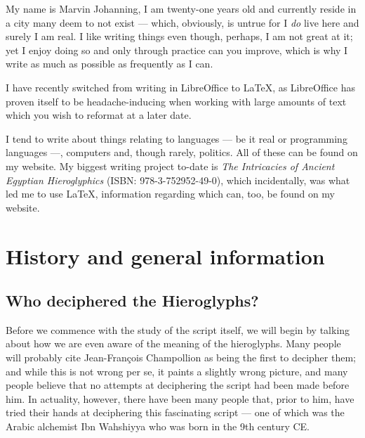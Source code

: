 \documentclass[a5paper,twoside,11pt]{report}
\begin{document}
		My name is Marvin Johanning, I am twenty-one years old and currently reside in a city many deem to not exist — which, obviously, is untrue for I \textit{do} live here and surely I am real. I like writing things even though, perhaps, I am not great at it; yet I enjoy doing so and only through practice can you improve, which is why I write as much as possible as frequently as I can.

		I have recently switched from writing in LibreOffice to \LaTeX, as LibreOffice has proven itself to be headache-inducing when working with large amounts of text which you wish to reformat at a later date. 

		I tend to write about things relating to languages — be it real or programming languages —, computers and, though rarely, politics. All of these can be found on my website. My biggest writing project to-date is \textit{The Intricacies of Ancient Egyptian Hieroglyphics} (ISBN: 978-3-752952-49-0), which incidentally, was what led me to use \LaTeX, information regarding which can, too, be found on my website.
		\newpage


\thispagestyle{empty}
  \mbox{}
  \newpage

\part*{History and general information}
  \newpage

\thispagestyle{empty}
  \mbox{}
  \newpage

\chapter*{Who deciphered the Hieroglyphs?}
  Before we commence with the study of the script itself, we will begin by talking about how we are even aware of the meaning of the hieroglyphs. Many people will probably cite Jean-François Champollion as being the first to decipher them; and while this is not wrong per se, it paints a slightly wrong picture, and many people believe that no attempts at deciphering the script had been made before him. In actuality, however, there have been many people that, prior to him, have tried their hands at deciphering this fascinating script — one of which was the Arabic alchemist Ibn Wahshiyya who was born in the 9th century CE.
\end{document}
